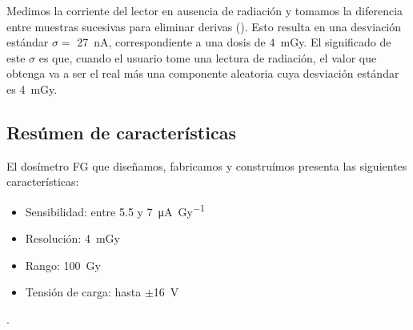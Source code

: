 Medimos la corriente del lector en ausencia de radiación y
tomamos la diferencia entre muestras sucesivas para eliminar derivas
().
Esto resulta en una desviación estándar
$\sigma=$ \SI{27}{\nano\ampere},
correspondiente a una dosis de \SI{4}{\milli\gray}.
El significado de este $\sigma$ es que,
cuando el usuario tome una lectura de radiación,
el valor que obtenga va a ser el real más una componente aleatoria
cuya desviación estándar es \SI{4}{\milli\gray}.
\subsection{Resúmen de características}
El dosímetro FG que diseñamos, fabricamos y construímos presenta las
siguientes características:
\begin{itemize}
    \item Sensibilidad: entre 5.5 y \SI{7}{\micro\ampere\per\gray}
    \item Resolución: \SI{4}{\milli\gray}
    \item Rango: \SI{100}{\gray}
    \item Tensión de carga: hasta $\pm$\SI{16}{\volt}
\end{itemize}.
